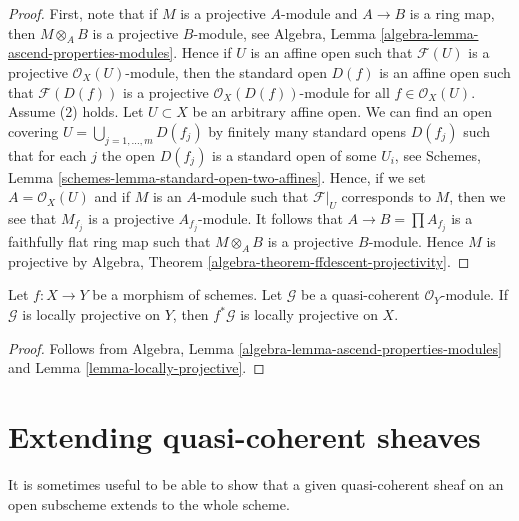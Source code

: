 \begin{proof}
First, note that if $M$ is a projective $A$-module and $A \to B$ is a
ring map, then $M \otimes_A B$ is a projective $B$-module, see
Algebra, Lemma \ref{algebra-lemma-ascend-properties-modules}.
Hence if $U$ is an affine open such that $\mathcal{F}(U)$ is a projective
$\mathcal{O}_X(U)$-module, then the standard open $D(f)$ is an
affine open such that $\mathcal{F}(D(f))$ is a projective
$\mathcal{O}_X(D(f))$-module for all $f \in \mathcal{O}_X(U)$.
Assume (2) holds. Let $U \subset X$ be an arbitrary affine open.
We can find an open covering $U = \bigcup_{j = 1, \ldots, m} D(f_j)$
by finitely many standard opens $D(f_j)$ such that for each
$j$ the open $D(f_j)$ is a standard open of some $U_i$, see
Schemes, Lemma \ref{schemes-lemma-standard-open-two-affines}.
Hence, if we set $A = \mathcal{O}_X(U)$ and if $M$ is an $A$-module
such that $\mathcal{F}|_U$ corresponds to $M$, then we see that
$M_{f_j}$ is a projective $A_{f_j}$-module. It follows that
$A \to B = \prod A_{f_j}$ is a faithfully flat ring map
such that $M \otimes_A B$ is a projective $B$-module.
Hence $M$ is projective by
Algebra, Theorem \ref{algebra-theorem-ffdescent-projectivity}.
\end{proof}

\begin{lemma}
\label{lemma-locally-projective-pullback}
Let $f : X \to Y$ be a morphism of schemes.
Let $\mathcal{G}$ be a quasi-coherent $\mathcal{O}_Y$-module.
If $\mathcal{G}$ is locally projective on $Y$, then $f^*\mathcal{G}$
is locally projective on $X$.
\end{lemma}

\begin{proof}
Follows from
Algebra, Lemma \ref{algebra-lemma-ascend-properties-modules}
and Lemma \ref{lemma-locally-projective}.
\end{proof}






\section{Extending quasi-coherent sheaves}
\label{section-extending-quasi-coherent-sheaves}

\noindent
It is sometimes useful to be able to show that a given quasi-coherent
sheaf on an open subscheme extends to the whole scheme.

